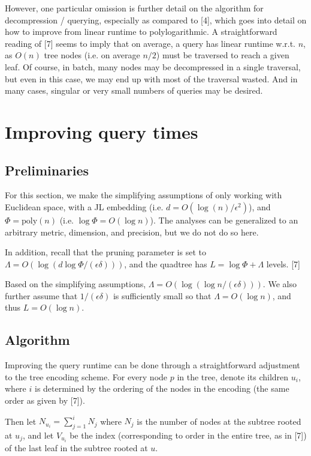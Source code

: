 \documentclass{article}
\begin{document}
However, one particular omission is further detail on the algorithm for
decompression / querying, especially as compared to [4], which goes into detail
on how to improve from linear runtime to polylogarithmic. A straightforward
reading of [7] seems to imply that on average, a query has linear runtime w.r.t.
$n$, as $O(n)$ tree nodes (i.e. on average $n/2$) must be traversed to reach a
given leaf. Of course, in batch, many nodes may be decompressed in a single
traversal, but even in this case, we may end up with most of the traversal
wasted. And in many cases, singular or very small numbers of queries may be
desired.

\section{Improving query times}

\subsection{Preliminaries}

For this section, we make the simplifying assumptions of only working with
Euclidean space, with a JL embedding (i.e. $d = O(\log(n)/\epsilon^2)$), and $\Phi =
\mathrm{poly }(n)$ (i.e. $\log \Phi = O(\log n)$). The analyses can be generalized
to an arbitrary metric, dimension, and precision, but we do not do so here.

In addition, recall that the pruning parameter is set to $\Lambda = O(\log (d \log \Phi /
(\epsilon\delta)))$, and the quadtree has $L = \log \Phi + \Lambda$ levels. [7]

Based on the simplifying assumptions, $\Lambda = O(\log (\log n / (\epsilon\delta)))$. We also
further assume that $1/(\epsilon\delta)$ is sufficiently small so that $\Lambda = O(\log n)$, and
thus $L = O(\log n)$.

\subsection{Algorithm}

Improving the query runtime can be done through a straightforward adjustment to
the tree encoding scheme. For every node $p$ in the tree, denote its children
$u_i$, where $i$ is determined by the ordering of the nodes in the encoding (the
same order as given by [7]).

Then let $N_{u_i} = \sum_{j = 1}^{i} N_j$ where $N_j$ is the number of nodes at the
subtree rooted at $u_j$, and let $V_{u_i}$ be the index (corresponding to order
in the entire tree, as in [7]) of the last leaf in the subtree rooted at $u$.
\end{document}
